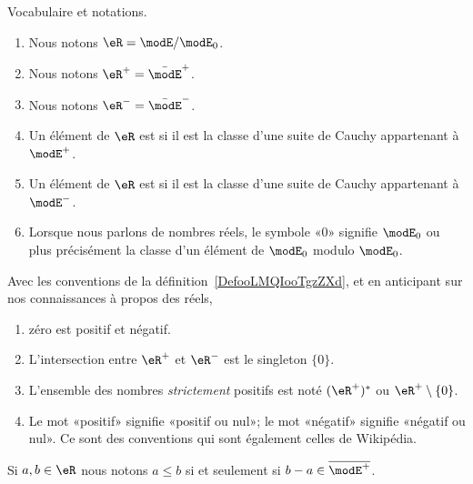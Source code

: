 \begin{definition}        \label{DefooLMQIooTgzZXd}
	Vocabulaire et notations.
	\begin{enumerate}
		\item
		      Nous notons \( \eR=\modE/\modE_0\).
		\item
		      Nous notons \( \eR^+=\bar\modE^+\).
		\item
		      Nous notons \( \eR^-=\bar\modE^-\).
		\item
		      Un élément de \( \eR\) est  si il est la classe d'une suite de Cauchy appartenant à \( \modE^+\).
		\item
		      Un élément de \( \eR\) est  si il est la classe d'une suite de Cauchy appartenant à \( \modE^-\).
		\item
		      Lorsque nous parlons de nombres réels, le symbole «\( 0\)» signifie \( \modE_0\) ou plus précisément la classe d'un élément de \( \modE_0\) modulo \( \modE_0\).
	\end{enumerate}
\end{definition}

\begin{normaltext}\label{REMooOCXLooKQrDoq}
	Avec les conventions de la définition~\ref{DefooLMQIooTgzZXd}, et en anticipant sur nos connaissances à propos des réels,
	\begin{enumerate}
		\item
		      zéro est positif et négatif.
		\item
		      L'intersection entre \( \eR^+\) et \( \eR^-\) est le singleton \( \{ 0 \}\).
		\item
		      L'ensemble des nombres \emph{strictement} positifs est noté \( (\eR^+)^*\) ou \( \eR^+\setminus\{ 0 \}\).
		\item
		      Le mot «positif» signifie «positif ou nul»; le mot «négatif» signifie «négatif ou nul». Ce sont des conventions qui sont également celles de Wikipédia\cite{ooSBSSooTlnuKi}.
	\end{enumerate}

\end{normaltext}

\begin{definition}      \label{DEFooBXHJooOEYPRI}
	Si \( a,b\in \eR\) nous notons \( a\leq b\) si et seulement si \( b-a\in\overline{ \modE^+ }\).
\end{definition}

